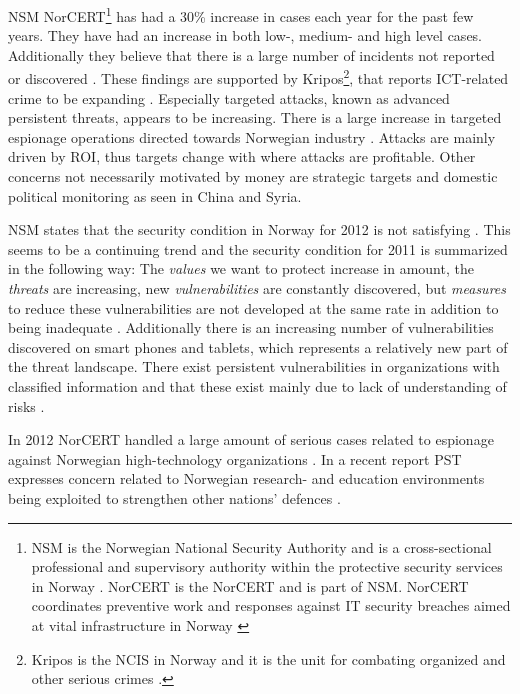 \acs{NSM} \acs{NorCERT}\footnote{\acs{NSM} is the Norwegian National Security Authority and is a cross-sectional professional and supervisory authority within the protective security services in Norway \cite{AboutNSM}. \acs{NorCERT} is the \acl{NorCERT} and is part of \acs{NSM}. \acs{NorCERT} coordinates preventive work and responses against IT security breaches aimed at vital infrastructure in Norway \cite{AboutNorCERT}} has had a 30\% increase in cases each year for the past few years. They have had an increase in both low-, medium- and high level cases. Additionally they believe that there is a large number of incidents not reported or discovered \cite{NorCERT3Kvartal2012}. These findings are supported by Kripos\footnote{Kripos is the \ac{NCIS} in Norway and it is the unit for combating organized and other serious crimes \cite{policeInNorway}.}, that reports ICT-related crime to be expanding \cite{KriposTrender}. Especially targeted attacks, known as advanced persistent threats, appears to be increasing\cite{Morketall2012}. There is a large increase in targeted espionage operations directed towards Norwegian industry \cite{NSMRapport2012}. Attacks are mainly driven by \ac{ROI}, thus targets change with where attacks are profitable. Other concerns not necessarily motivated by money are strategic targets and domestic political monitoring as seen in China and Syria\cite{Morketall2012}.

\acs{NSM} states that the security condition in Norway for 2012 is not satisfying \cite{samordnaVurdering}. This seems to be a continuing trend and the security condition for 2011 is summarized in the following way: The \textit{values} we want to protect increase in amount, the \textit{threats} are increasing, new \textit{vulnerabilities} are constantly discovered, but \textit{measures} to reduce these vulnerabilities are not developed at the same rate in addition to being inadequate \cite{NSMRapport}. Additionally there is an increasing number of vulnerabilities discovered on smart phones and tablets, which represents a relatively new part of the threat landscape. There exist persistent vulnerabilities in organizations with classified information and that these exist mainly due to lack of understanding of risks \cite{NSMRapport2012}.

In 2012 \acs{NorCERT} handled a large amount of serious cases related to espionage against Norwegian high-technology organizations \cite{NorCERT3Kvartal2012}. In a recent report PST expresses concern related to Norwegian research- and education environments being exploited to strengthen other nations' defences \cite{PSTvurdering2013}.   

